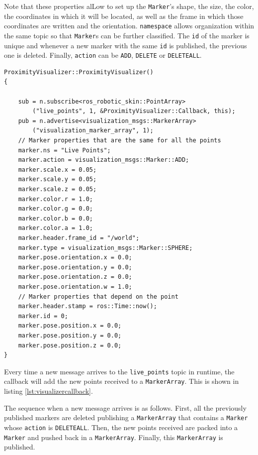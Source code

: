 Note that these properties alLow to set up the \lstinline{Marker}'s shape, the size, the color, the coordinates in which it will be located, as well as the frame in which those coordinates are written and the orientation. \lstinline[language=python]{namespace} allows organization within the same topic so that \lstinline{Marker}s can be further classified. The \lstinline{id} of the marker is unique and whenever a new marker with the same \lstinline{id} is published, the previous one is deleted. Finally, \lstinline{action} can be \lstinline{ADD}, \lstinline{DELETE} or \lstinline{DELETEALL}.

\begin{lstlisting}[caption={Initializer of the ProximityVisualizer class},captionpos=b,label={lst:proximityinitializer}]
ProximityVisualizer::ProximityVisualizer()
{

    sub = n.subscribe<ros_robotic_skin::PointArray>
        ("live_points", 1, &ProximityVisualizer::Callback, this);
    pub = n.advertise<visualization_msgs::MarkerArray>
        ("visualization_marker_array", 1);
    // Marker properties that are the same for all the points
    marker.ns = "Live Points";
    marker.action = visualization_msgs::Marker::ADD;
    marker.scale.x = 0.05;
    marker.scale.y = 0.05;
    marker.scale.z = 0.05;
    marker.color.r = 1.0;
    marker.color.g = 0.0;
    marker.color.b = 0.0;
    marker.color.a = 1.0;
    marker.header.frame_id = "/world";
    marker.type = visualization_msgs::Marker::SPHERE;
    marker.pose.orientation.x = 0.0;
    marker.pose.orientation.y = 0.0;
    marker.pose.orientation.z = 0.0;
    marker.pose.orientation.w = 1.0;
    // Marker properties that depend on the point
    marker.header.stamp = ros::Time::now();
    marker.id = 0;
    marker.pose.position.x = 0.0;
    marker.pose.position.y = 0.0;
    marker.pose.position.z = 0.0;
}
\end{lstlisting}

Every time a new message arrives to the \lstinline{live_points} topic in runtime, the callback will add the new points received  to a \lstinline{MarkerArray}. This is shown in listing \ref{lst:visualizercallback}.

The sequence when a new message arrives is as follows. First, all the previously published markers are deleted publishing a \lstinline{MarkerArray} that contains a \lstinline{Marker} whose \lstinline{action} is \lstinline{DELETEALL}. Then, the new points received are packed into a \lstinline{Marker} and pushed back in a \lstinline{MarkerArray}. Finally, this \lstinline{MarkerArray} is published.

